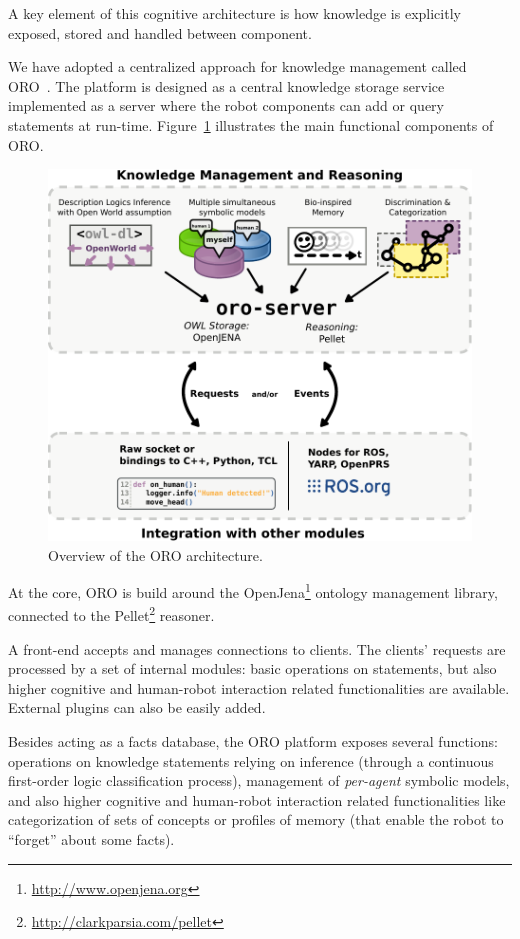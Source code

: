\documentclass{svmult}
\begin{document}
A key element of this cognitive architecture is how knowledge is explicitly
exposed, stored and handled between component.

We have adopted a centralized approach for knowledge management called
ORO~\cite{Lemaignan2010}. The platform is designed as a central
knowledge storage service implemented as a server where the robot
components can add or query statements at run-time. Figure~\ref{fig|oro-overview}
illustrates the main functional components of ORO.

\begin{figure}
\centering
  \includegraphics[width=0.8\linewidth]{figs/oro_architecture_functional.pdf}
  \caption{Overview of the ORO architecture.}
  \label{fig|oro-overview}
\end{figure}

At the core, ORO is build around the
OpenJena\footnote{\url{http://www.openjena.org}} ontology management library,
connected to the Pellet\footnote{\url{http://clarkparsia.com/pellet}} reasoner.

A front-end accepts and manages connections to clients. The clients' requests
are processed by a set of internal modules: basic operations on statements, but
also higher cognitive and human-robot interaction related functionalities are
available. External plugins can also be easily added.

Besides acting as a facts database, the ORO platform exposes several functions:
operations on knowledge statements relying on inference (through a continuous
first-order logic classification process), management of \emph{per-agent}
symbolic models, and also higher cognitive and human-robot interaction related
functionalities like categorization of sets of concepts or profiles of memory
(that enable the robot to ``forget'' about some facts).
\end{document}
